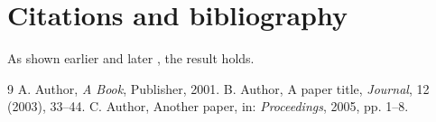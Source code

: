 \documentclass{article}
\begin{document}
\section{Citations and bibliography}

As shown earlier \cite{alpha} and later \cite{beta,gamma}, the result holds.

\begin{thebibliography}{9}
 A. Author, \emph{A Book}, Publisher, 2001.
 B. Author, A paper title, \emph{Journal}, 12 (2003), 33--44.
 C. Author, Another paper, in: \emph{Proceedings}, 2005, pp. 1--8.
\end{thebibliography}
\end{document}
